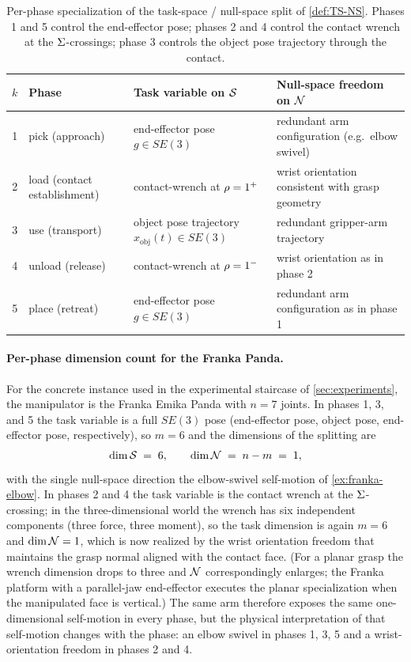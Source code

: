 \begin{table}[h]
\centering
\small
\begin{tabular}{@{}clll@{}}
\toprule
$k$ & Phase & Task variable on $\mathcal{S}$ & Null-space freedom on $\mathcal{N}$ \\
\midrule
1 & pick (approach) & end-effector pose $g \in SE(3)$
  & redundant arm configuration (e.g.\ elbow swivel) \\
2 & load (contact establishment) & contact-wrench at $\rho = 1^{+}$
  & wrist orientation consistent with grasp geometry \\
3 & use (transport) & object pose trajectory $x_{\mathrm{obj}}(t) \in SE(3)$
  & redundant gripper-arm trajectory \\
4 & unload (release) & contact-wrench at $\rho = 1^{-}$
  & wrist orientation as in phase 2 \\
5 & place (retreat) & end-effector pose $g \in SE(3)$
  & redundant arm configuration as in phase 1 \\
\bottomrule
\end{tabular}
\caption{Per-phase specialization of the task-space /
null-space split of \cref{def:TS-NS}. Phases 1 and 5 control the
end-effector pose; phases 2 and 4 control the contact wrench at
the $\Sigma$-crossings; phase 3 controls the object pose
trajectory through the contact.}
\label{tab:tn-per-phase}
\end{table}

\paragraph{Per-phase dimension count for the Franka Panda.}
For the concrete instance used in the experimental staircase of
\cref{sec:experiments}, the manipulator is the Franka Emika Panda
with $n = 7$ joints. In phases 1, 3, and 5 the task variable is a
full $SE(3)$ pose (end-effector pose, object pose, end-effector
pose, respectively), so $m = 6$ and the dimensions of the
splitting are
\[
  \dim \mathcal{S} \;=\; 6,
  \qquad
  \dim \mathcal{N} \;=\; n - m \;=\; 1,
\]
with the single null-space direction the elbow-swivel self-motion
of \cref{ex:franka-elbow}. In phases 2 and 4 the task variable
is the contact wrench at the $\Sigma$-crossing; in the
three-dimensional world the wrench has six independent components
(three force, three moment), so the task dimension is again
$m = 6$ and $\dim \mathcal{N} = 1$, which is now realized by the wrist
orientation freedom that maintains the grasp normal aligned with
the contact face. (For a planar grasp the wrench dimension drops
to three and $\mathcal{N}$ correspondingly enlarges; the Franka platform
with a parallel-jaw end-effector executes the planar specialization
when the manipulated face is vertical.) The same arm therefore
exposes the same one-dimensional self-motion in every phase, but
the physical interpretation of that self-motion changes with the
phase: an elbow swivel in phases 1, 3, 5 and a wrist-orientation
freedom in phases 2 and 4.


